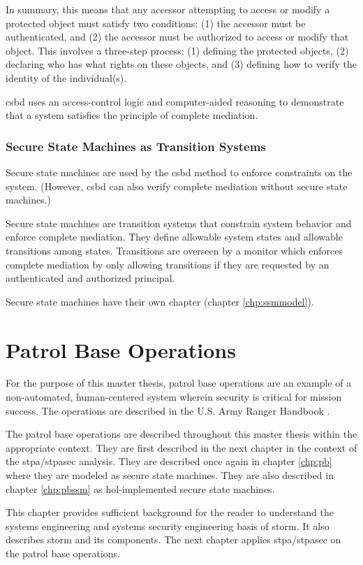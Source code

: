 \documentclass[../../main/main.tex]{subfiles}
\begin{document}
In summary, this means that any accessor attempting to access or modify a protected object must satisfy two conditions: (1) the accessor must be authenticated, and (2) the accessor must be authorized to access or modify that object.  This involves a three-step process: (1) defining the protected objects, (2) declaring who has what rights on these objects, and (3) defining how to verify the identity of the individual(s).  

\gls{csbd} uses an access-control logic and computer-aided reasoning to demonstrate that a system satisfies the principle of complete mediation.

\subsubsection{Secure State Machines as Transition Systems }\label{sssect:ssmts}
Secure state machines are used by the \gls{csbd} method to enforce constraints on the system.  (However, \gls{csbd} can also verify complete mediation without secure state machines.)

Secure state machines are transition systems that constrain system behavior and enforce complete mediation.  They define allowable system states and allowable transitions among states. Transitions are overseen by a monitor which enforces complete mediation by only allowing transitions if they are requested by an authenticated and authorized principal. 

Secure state machines have their own chapter (chapter \ref{chp:ssmmodel}).
\section{Patrol Base Operations}\label{sec:stormpb}
For the purpose of this master thesis, patrol base operations are an example of a non-automated, human-centered system wherein security is critical for mission success.  The operations are described in the U.S. Army Ranger Handbook \cite{rangermanual}.

The patrol base operations are described throughout this master thesis within the appropriate context.  They are first described in the next chapter in the context of the \gls{stpa}/\gls{stpasec} analysis.  They are described once again in chapter \ref{chp:pb} where they are modeled as secure state machines.  They are also described in chapter \ref{chp:pbssm} as \gls{hol}-implemented secure state machines.

This chapter provides sufficient background for the reader to understand the systems engineering and systems security engineering basis of \gls{storm}.  It also describes \gls{storm} and its components.  The next chapter applies  \gls{stpa}/\gls{stpasec} on the patrol base operations.
\end{document}
